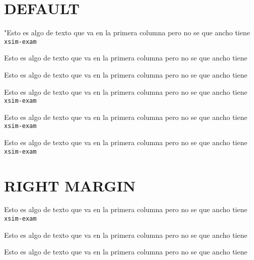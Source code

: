 \documentclass{article}
\begin{document}
\section{DEFAULT}

        \begin{enumext}[list-offset=0cm,columns=3, columns-sep=1cm,show-length=true, rightmargin =0cm]
          \item "Esto es algo de texto que va en la primera columna pero no se que ancho tiene \texttt{xsim-exam} \columnbreak%
          \item Esto es algo de texto que va en la primera columna pero no se que ancho tiene \columnbreak%
          \item Esto es algo de texto que va en la primera columna pero no se que ancho tiene%
        \end{enumext}

        \begin{enumext*}[list-indent=0cm,columns=3,columns-sep=1cm,show-length=true,  rightmargin =0cm]
          \item Esto es algo de texto que va en la primera columna pero no se que ancho tiene \texttt{xsim-exam}
          \item Esto es algo de texto que va en la primera columna pero no se que ancho tiene \texttt{xsim-exam}
          \item Esto es algo de texto que va en la primera columna pero no se que ancho tiene \texttt{xsim-exam}
        \end{enumext*}

\section{RIGHT MARGIN}

        \begin{enumext}[list-offset=-1.5cm,columns=3, columns-sep=0cm,show-length=true, rightmargin =0.5cm]
          \item Esto es algo de texto que va en la primera columna pero
            no se que ancho tiene \texttt{xsim-exam} \columnbreak%
          \item Esto es algo de texto que va en la primera columna pero no se que ancho tiene \columnbreak%
          \item Esto es algo de texto que va en la primera columna pero no se que ancho tiene%
        \end{enumext}
\end{document}
